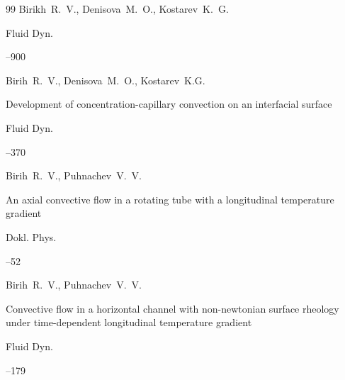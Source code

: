 \begin{thebibliography}{99}
\by Birikh~R.~V., Denisova~M.~O., Kostarev~K.~G.

\jour Fluid Dyn.




--900








\by Birih~R.~V., Denisova~M.~O., Kostarev~K.G.

\paper Development of concentration-capillary convection on an interfacial surface

\jour 	Fluid Dyn.




--370






\by Birih~R.~V., Puhnachev~V.~V.

\paper An axial convective flow in a rotating tube with a longitudinal temperature gradient

\jour Dokl. Phys.




--52





\by Birih~R.~V., Puhnachev~V.~V.

\paper Convective flow in a horizontal channel with non-newtonian surface rheology under time-dependent longitudinal temperature gradient

\jour Fluid Dyn.




--179



\end{thebibliography}
